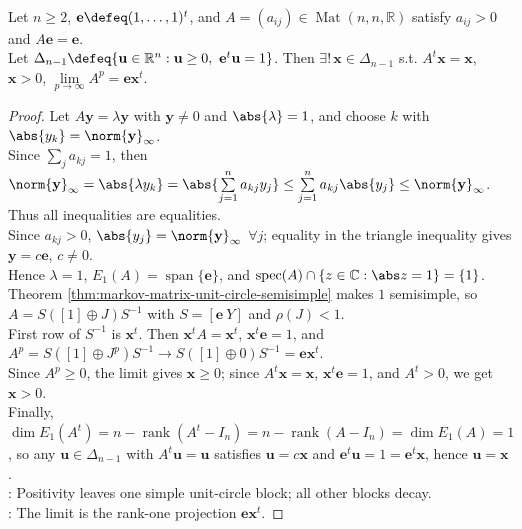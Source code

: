 \begin{theorem} \label{thm:positive-markov-stationary-distribution} \\
Let $n\geq2$, $\mathbf{e}\defeq(1,\ldots,1)^t$, and $A=(a_{ij})\in\operatorname{Mat}(n,n,\mathbb{R})$ satisfy $a_{ij}>0$ and $A\mathbf{e}=\mathbf{e}$.\\
Let $\Delta_{n-1}\defeq\{\mathbf{u}\in\mathbb{R}^n:\mathbf{u}\geq0,\ \mathbf{e}^t\mathbf{u}=1\}$. Then $\exists!\,\mathbf{x}\in\Delta_{n-1}$ s.t. $A^t\mathbf{x}=\mathbf{x}$, $\mathbf{x}>0$, $\lim\limits_{p\to\infty}A^p=\mathbf{e}\mathbf{x}^t$.
\begin{proof}
Let $A\mathbf{y}=\lambda\mathbf{y}$ with $\mathbf{y}\neq0$ and $\abs{\lambda}=1$, and choose $k$ with $\abs{y_k}=\norm{\mathbf{y}}_{\infty}$.\\
Since $\sum\limits_j a_{kj}=1$, then $\norm{\mathbf{y}}_{\infty} =\abs{\lambda y_k} =\abs{\sum\limits_{j=1}^{n}a_{kj}y_j} \leq\sum\limits_{j=1}^{n}a_{kj}\abs{y_j} \leq\norm{\mathbf{y}}_{\infty}$. Thus all inequalities are equalities.\\
Since $a_{kj}>0$, $\abs{y_j}=\norm{\mathbf{y}}_{\infty}$ $\forall j$; equality in the triangle inequality gives $\mathbf{y}=c\mathbf{e}$, $c\neq0$.\\
Hence $\lambda=1$, $E_1(A)=\operatorname{span}\{\mathbf{e}\}$, and $\operatorname{spec}(A)\cap\{z\in\mathbb{C}:\abs z=1\}=\{1\}$.\\
Theorem \ref{thm:markov-matrix-unit-circle-semisimple} makes $1$ semisimple, so $A=S([1]\oplus J)S^{-1}$ with $S=[\mathbf{e}\ Y]$ and $\rho(J)<1$.\\
First row of $S^{-1}$ is $\mathbf{x}^t$. Then $\mathbf{x}^tA=\mathbf{x}^t$, $\mathbf{x}^t\mathbf{e}=1$, and $A^p=S([1]\oplus J^p)S^{-1}\longrightarrow S([1]\oplus0)S^{-1}=\mathbf{e}\mathbf{x}^t$.\\
Since $A^p\geq0$, the limit gives $\mathbf{x}\geq0$; since $A^t\mathbf{x}=\mathbf{x}$, $\mathbf{x}^t\mathbf{e}=1$, and $A^t>0$, we get $\mathbf{x}>0$.\\
Finally, $\dim E_1(A^t)=n-\operatorname{rank}(A^t-I_n)=n-\operatorname{rank}(A-I_n)=\dim E_1(A)=1$, so any $\mathbf{u}\in\Delta_{n-1}$ with $A^t\mathbf{u}=\mathbf{u}$ satisfies $\mathbf{u}=c\mathbf{x}$ and $\mathbf{e}^t\mathbf{u}=1=\mathbf{e}^t\mathbf{x}$, hence $\mathbf{u}=\mathbf{x}$.\\
: Positivity leaves one simple unit-circle block; all other blocks decay.\\
: The limit is the rank-one projection $\mathbf{e}\mathbf{x}^t$.
\end{proof}
\end{theorem}

